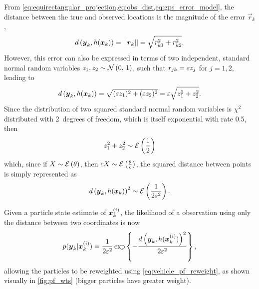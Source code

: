 From \cref{eq:equirectangular_projection,eq:obs_dist,eq:gps_error_model}, the distance between the true and observed locations is the magnitude of the error $\vec{r}_k$,
\begin{equation}
d\left(\boldsymbol{y}_k, h(\boldsymbol x_k)\right) = ||\boldsymbol{r}_k|| =
    \sqrt{r_{k1}^2 + r_{k2}^2}.
\end{equation}
However, this error can also be expressed in terms of two independent, standard normal random variables $z_1, z_2 \sim \mathcal{N}\left(0,\, 1\right)$, such that $r_{jk} = \varepsilon z_j$ for $j = 1, 2$, leading to
\begin{equation}
d\left(\boldsymbol{y}_k, h(\boldsymbol x_k)\right) =
    \sqrt{(\varepsilon z_1)^2 + (\varepsilon z_2)^2} =
    \varepsilon \sqrt{z_1^2 + z_2^2}.
\end{equation}
Since the distribution of two squared standard normal random variables is $\chi^2$ distributed with 2~degrees of freedom, which is itself exponential with rate 0.5, then
\begin{equation}
\label{eq:sum_sq_dist}
z_1^2 + z_2^2 \sim \mathcal{E}\left(\frac{1}{2}\right)
\end{equation}
which, since if $X \sim \mathcal{E}\left(\theta\right)$, then $cX \sim \mathcal{E}\left(\frac{\theta}{c}\right)$, the squared distance between points is simply represented as
\begin{equation}
\label{eq:distance_distrib}
d\left(\boldsymbol{y}_k, h(\boldsymbol x_k)\right)^2 \sim \mathcal{E}\left(\frac{1}{2\varepsilon^2}\right).
\end{equation}

Given a particle state estimate of $\boldsymbol x^{(i)}_k$,
the likelihood of a \GPS{} observation using only
the distance between two coordinates is now
\begin{equation}
\label{eq:particle_lh_fun}
p(\boldsymbol{y}_k | \boldsymbol x^{(i)}_k) =
    \frac{1}{2\varepsilon^2} \exp\left\{
        - \frac{d\left(\boldsymbol{y}_k, h(\boldsymbol x^{(i)}_k)\right)^2}{2\varepsilon^2}
    \right\},
\end{equation}
allowing the particles to be reweighted using \cref{eq:vehicle_pf_reweight}, as shown visually in \cref{fig:pf_wts} (bigger particles have greater weight).


